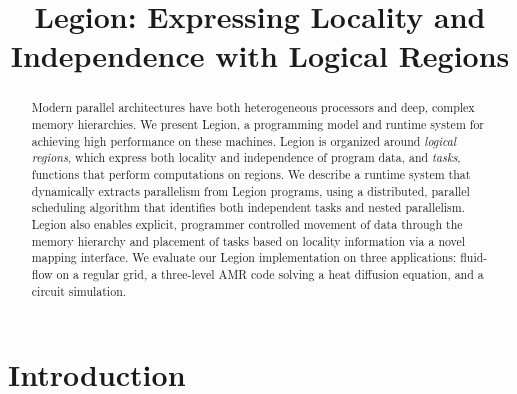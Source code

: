 \documentclass[conference]{IEEEtran}
\begin{document}
\pdfpagewidth=8.5in
\pdfpageheight=11in

\title{Legion: Expressing Locality and Independence with Logical Regions}
\author{
}

\maketitle


\begin{abstract}
Modern parallel architectures have both heterogeneous processors and
deep, complex memory hierarchies.  We present Legion, a programming
model and runtime system for achieving high performance on these
machines.  Legion is organized around {\em logical regions}, which
express both locality and independence of program data, and {\em
  tasks}, functions that perform computations on regions.  We describe
a runtime system that dynamically extracts parallelism from
Legion programs, using a distributed, parallel scheduling algorithm
that identifies both independent tasks and nested parallelism.  Legion
also enables explicit, programmer controlled movement of data through
the memory hierarchy and placement of tasks based on locality
information via a novel mapping interface.  We evaluate our Legion
implementation on three applications: fluid-flow on a regular grid,
a three-level AMR code solving a heat diffusion equation, and 
a circuit simulation.
%
%
\end{abstract}

\section{Introduction}
\label{sect:intro}
\end{document}
